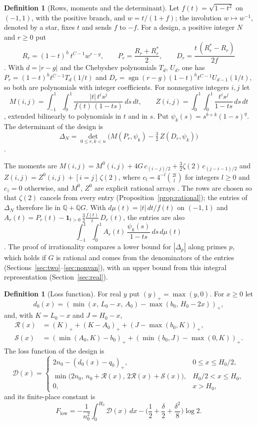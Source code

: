 \documentclass[11pt]{article}
\theoremstyle{definition}
\newtheorem{definition}[theorem]{Definition}
\newcommand{\pos}[1]{\left(#1\right)_{+}}
\newcommand{\Dl}{\mathcal{D}}
\newcommand{\Rl}{\mathcal{R}}
\newcommand{\Sl}{\mathcal{S}}
\begin{document}
\begin{definition}[Rows, moments and the determinant]\label{def:det}
Let $f(t)=\sqrt{1-t^2}$ on $(-1,1)$, with the positive branch, and $w=t/(1+f)$; the involution $w\mapsto w^{-1}$, denoted by a star, fixes $t$ and sends $f$ to $-f$. For a design, a positive integer $N$ and $r\ge0$ put
\[
R_r=(1-t)^h\,t^{C-1}w^{r-g},\qquad P_r=\frac{R_r+R_r^*}2,\qquad D_r=\frac{t\,(R_r^*-R_r)}{2f}
\]
\cite[Eq.~(3)]{OAI}. With $d=|r-g|$ and the Chebyshev polynomials $T_d$, $U_d$, one has $P_r=(1-t)^ht^{C-1}T_d(1/t)$ and $D_r=\operatorname{sgn}(r-g)(1-t)^ht^{C-1}U_{d-1}(1/t)$, so both are polynomials with integer coefficients. For nonnegative integers $i,j$ let
\[
M(i,j)=\int_{-1}^1\!\int_0^1\frac{|t|\,t^is^j}{f(t)\,(1-ts)}\,ds\,dt,\qquad Z(i,j)=\int_0^1\!\int_0^1\frac{t^is^j}{1-ts}\,ds\,dt
\]
\cite[Eq.~(6)]{OAI}, extended bilinearly to polynomials in $t$ and in $s$. Put $\psi_k(s)=s^{b+k}(1-s)^q$. The determinant of the design is
\[
\Delta_N=\det_{0\le r,k<n}\Big(M(P_r,\psi_k)-\tfrac32\,Z(D_r,\psi_k)\Big)
\]
\cite[Eq.~(7)]{OAI}.
\end{definition}

The moments are $M(i,j)=M^0(i,j)+4G\,c_{(i-j)/2}+\frac32\zeta(2)\,c_{(j-i-1)/2}$ and $Z(i,j)=Z^0(i,j)+[i=j]\,\zeta(2)$, where $c_l=4^{-l}\binom{2l}l$ for integers $l\ge0$ and $c_z=0$ otherwise, and $M^0$, $Z^0$ are explicit rational arrays \cite[Eqs.~(14), (16), (17)]{OAI}. The rows are chosen so that $\zeta(2)$ cancels from every entry (Proposition~\ref{prop:rational}); the entries of $\Delta_N$ therefore lie in $\mathbb Q+\mathbb QG$. With $d\mu(t)=|t|\,dt/f(t)$ on $(-1,1)$ and $A_r(t)=P_r(t)-\mathbf 1_{t>0}\,\frac32\frac{f(t)}t\,D_r(t)$, the entries are also
\[
\int_{-1}^1\!\int_0^1A_r(t)\,\frac{\psi_k(s)}{1-ts}\,ds\,d\mu(t)
\]
\cite[Sec.~5.1]{OAI}. The proof of irrationality compares a lower bound for $|\Delta_p|$ along primes $p$, which holds if $G$ is rational and comes from the denominators of the entries (Sections~\ref{sec:two}--\ref{sec:nonvan}), with an upper bound from this integral representation (Section~\ref{sec:real}).



\begin{definition}[Loss function]\label{def:loss}
For real $y$ put $\pos{y}=\max(y,0)$. For $x\ge0$ let
\[
d_0(x)=\pos{\min(x,\,L_0-x,\,A_0)-\max(b_0,\,H_0-2x)},
\]
and, with $K=L_0-x$ and $J=H_0-x$,
\begin{align*}
\Rl(x)&=\pos{K}+\pos{K-A_0}+\pos{J-\max(b_0,K)},\\
\Sl(x)&=\pos{\min(A_0,K)-b_0}+\pos{\min(b_0,J)-\max(0,K)}.
\end{align*}
The loss function of the design is
\[
\Dl(x)=\begin{cases}
2n_0-\pos{d_0(x)-q_0}, & 0\le x\le H_0/2,\\
\min\big(2n_0,\,n_0+\Rl(x),\,2\Rl(x)+\Sl(x)\big), & H_0/2<x\le H_0,\\
0, & x>H_0,
\end{cases}
\]
and its finite-place constant is
\[
F_{\mathrm{low}}=-\frac{1}{n_0^2}\int_0^{H_0}\Dl(x)\,dx-\Big(\frac12+\frac{\delta}{2}+\frac{\delta^2}{8}\Big)\log2 .
\]
\end{definition}
\end{document}
